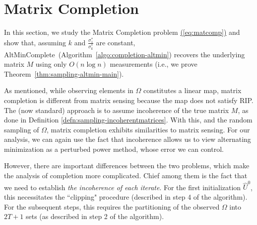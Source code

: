 \documentclass[11pt]{article}
\renewcommand{\eqref}[1]{\hyperref[#1]{(\ref*{#1})}}
\theoremstyle{plain}
\theoremstyle{definition}
\newcommand{\wt}[1]{\widetilde{#1}}
\newcommand{\wh}{\widehat}
\newcommand{\so}{\sigma^*}
\newcommand{\amc}{AltMinComplete\ }
\begin{document}

\newcommand{\uht}{\widehat{u}^t}
\section{Matrix Completion}
In this section, we study the Matrix Completion problem \eqref{eq:matcomp} and show that, assuming $k$ and $\frac{\so_1}{\so_k}$ are constant, \amc (Algorithm~\ref{algo:completion-altmin}) recovers the underlying matrix $M$ using only $O(n \log n)$ measurements (i.e., we prove Theorem~\ref{thm:sampling-altmin-main}).

As mentioned, while observing elements in $\Omega$ constitutes a linear map, matrix completion is different from matrix sensing because the map does not satisfy RIP. The (now standard) approach is to assume incoherence of the true matrix $M$, as done in Definition \ref{defn:sampling-incoherentmatrices}. With this, and the random sampling of $\Omega$, matrix completion exhibits similarities to matrix sensing. For our analysis, we can again use the fact that incoherence allows us to view alternating minimization as a perturbed power method, whose error we can control.

However, there are important differences between the two problems, which make the analysis of completion more complicated. Chief among them is the fact that we need to establish {\em the incoherence of each iterate}. For the first initialization $\widehat{U}^0$, this necessitates the ``clipping" procedure (described in step 4 of the algorithm). For the subsequent steps, this requires the partitioning of the observed $\Omega$ into $2T+1$ sets (as described in step 2 of the algorithm).
\end{document}
